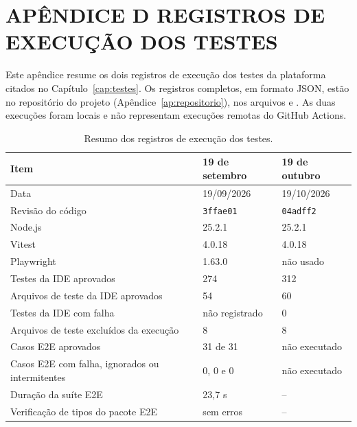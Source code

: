 \chapter[APÊNDICE D -- REGISTROS DE EXECUÇÃO DOS TESTES]{{\centering APÊNDICE D \textendash{} REGISTROS DE EXECUÇÃO DOS TESTES}}  \label{ap:verificacao}

Este apêndice resume os dois registros de execução dos testes da plataforma citados no Capítulo~\ref{cap:testes}. Os registros completos, em formato JSON, estão no repositório do projeto (Apêndice~\ref{ap:repositorio}), nos arquivos  e . As duas execuções foram locais e não representam execuções remotas do GitHub Actions.

\begin{table}[htbp]
\centering
\caption{Resumo dos registros de execução dos testes.}
\label{tab:ap-verificacao}
\footnotesize
\renewcommand{\arraystretch}{1.2}
\begin{tabular}{|p{6.4cm}|p{3.4cm}|p{3.4cm}|}
\hline
\textbf{Item} & \textbf{19 de setembro} & \textbf{19 de outubro} \\\hline
Data & 19/09/2026 & 19/10/2026 \\\hline
Revisão do código & \texttt{3ffae01} & \texttt{04adff2} \\\hline
Node.js & 25.2.1 & 25.2.1 \\\hline
Vitest & 4.0.18 & 4.0.18 \\\hline
Playwright & 1.63.0 & não usado \\\hline
Testes da IDE aprovados & 274 & 312 \\\hline
Arquivos de teste da IDE aprovados & 54 & 60 \\\hline
Testes da IDE com falha & não registrado & 0 \\\hline
Arquivos de teste excluídos da execução & 8 & 8 \\\hline
Casos E2E aprovados & 31 de 31 & não executado \\\hline
Casos E2E com falha, ignorados ou intermitentes & 0, 0 e 0 & não executado \\\hline
Duração da suíte E2E & 23,7 s & -- \\\hline
Verificação de tipos do pacote E2E & sem erros & -- \\\hline
\end{tabular}
\end{table}

